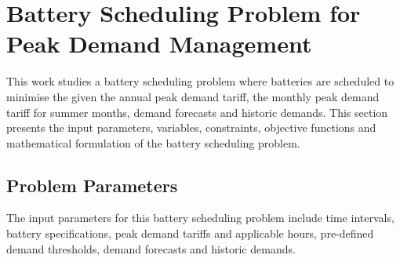 
%
%	
%	
%	
%	

\section{Battery Scheduling Problem for Peak Demand Management}
\label{pdm:prob}

This work studies a battery scheduling problem where batteries are scheduled to minimise the  given the annual peak demand tariff, the monthly peak demand tariff for summer months, demand forecasts and historic demands. 
This section presents the input parameters, variables, constraints, objective functions and mathematical formulation of the battery scheduling problem. 



\subsection{Problem Parameters}

The input parameters for this battery scheduling problem include time intervals, battery specifications, peak demand tariffs and applicable hours, pre-defined demand thresholds, demand forecasts and historic demands.

